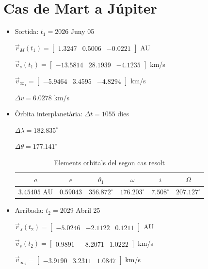 \section{Cas de Mart a Júpiter}
\begin{itemize}
	\item Sortida: $t_{1}=$2026 Juny 05

$\vec{r}_{M}(t_{1})=\begin{bmatrix}1.3247 & 0.5006 & -0.0221\end{bmatrix}$ AU

$\vec{v}_{s}(t_{1})=\begin{bmatrix}-13.5814 & 28.1939 & -4.1235\end{bmatrix}$ km/s

$\vec{v}_{\infty_{1}}= \begin{bmatrix}-5.9464 & 3.4595 & -4.8294\end{bmatrix}$ km/s

$\Delta v=6.0278$ km/s

	\item Òrbita interplanetària: $\Delta t=1055$ dies

$\Delta\lambda=182.835^{\circ}$
	
$\Delta\theta=177.141^{\circ}$
\begin{table}[h!]
	\centering
	\begin{tabular}{ |c|c|c|c|c|c|}
		\hline
		$a$ & $e$ & $\theta_{1}$ & $\omega$ & $i$ & $\Omega$ \\ \hline
		$3.45405$ AU  & $0.59043$ & $356.872^{\circ}$ & $176.203^{\circ}$ & $7.508^{\circ}$ & $207.127^{\circ}$ \\ \hline
	\end{tabular}
	\caption{Elements orbitals del segon cas resolt}
\end{table}
	\item Arribada: $t_{2}=$2029 Abril 25

$\vec{r}_{J}(t_{2})=\begin{bmatrix}-5.0246 & -2.1122 & 0.1211\end{bmatrix}$ AU

$\vec{v}_{s}(t_{2})=\begin{bmatrix}0.9891 & -8.2071 & 1.0222\end{bmatrix}$ km/s


$\vec{v}_{\infty_{2}}=\begin{bmatrix}-3.9190 & 3.2311 & 1.0847\end{bmatrix}$ km/s
\end{itemize}
